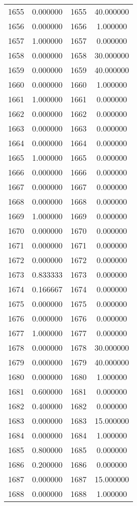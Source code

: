 \documentclass[12pt]{article}
\begin{document}
\begin{longtable}{@{}cccc@{}}
1655 & 0.000000 & 1655 & 40.000000 \\
1656 & 0.000000 & 1656 & 1.000000 \\
1657 & 1.000000 & 1657 & 0.000000 \\
1658 & 0.000000 & 1658 & 30.000000 \\
1659 & 0.000000 & 1659 & 40.000000 \\
1660 & 0.000000 & 1660 & 1.000000 \\
1661 & 1.000000 & 1661 & 0.000000 \\
1662 & 0.000000 & 1662 & 0.000000 \\
1663 & 0.000000 & 1663 & 0.000000 \\
1664 & 0.000000 & 1664 & 0.000000 \\
1665 & 1.000000 & 1665 & 0.000000 \\
1666 & 0.000000 & 1666 & 0.000000 \\
1667 & 0.000000 & 1667 & 0.000000 \\
1668 & 0.000000 & 1668 & 0.000000 \\
1669 & 1.000000 & 1669 & 0.000000 \\
1670 & 0.000000 & 1670 & 0.000000 \\
1671 & 0.000000 & 1671 & 0.000000 \\
1672 & 0.000000 & 1672 & 0.000000 \\
1673 & 0.833333 & 1673 & 0.000000 \\
1674 & 0.166667 & 1674 & 0.000000 \\
1675 & 0.000000 & 1675 & 0.000000 \\
1676 & 0.000000 & 1676 & 0.000000 \\
1677 & 1.000000 & 1677 & 0.000000 \\
1678 & 0.000000 & 1678 & 30.000000 \\
1679 & 0.000000 & 1679 & 40.000000 \\
1680 & 0.000000 & 1680 & 1.000000 \\
1681 & 0.600000 & 1681 & 0.000000 \\
1682 & 0.400000 & 1682 & 0.000000 \\
1683 & 0.000000 & 1683 & 15.000000 \\
1684 & 0.000000 & 1684 & 1.000000 \\
1685 & 0.800000 & 1685 & 0.000000 \\
1686 & 0.200000 & 1686 & 0.000000 \\
1687 & 0.000000 & 1687 & 15.000000 \\
1688 & 0.000000 & 1688 & 1.000000 \\

\end{longtable}
\end{document}
